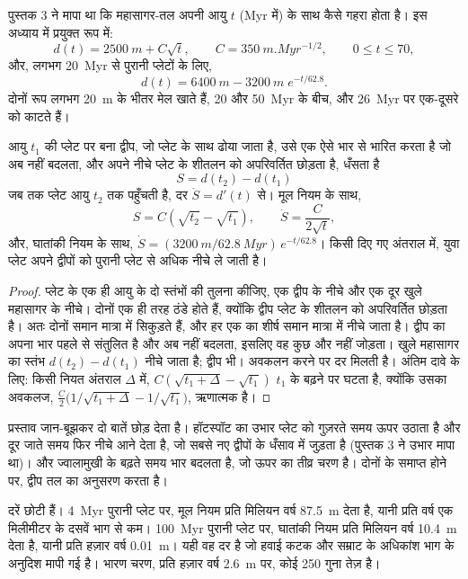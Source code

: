 पुस्तक 3 ने मापा था कि महासागर-तल अपनी आयु $t$ (\unit{Myr} में) के साथ कैसे गहरा होता है। इस
अध्याय में प्रयुक्त रूप में:
\[
d(t) = \qty{2500}{m} + C\sqrt{t}, \qquad C = \qty{350}{m.Myr^{-1/2}}, \qquad 0 \le t \le 70,
\]
और, लगभग \qty{20}{Myr} से पुरानी प्लेटों के लिए,
\[
d(t) = \qty{6400}{m} - \qty{3200}{m}\; e^{-t/62.8}.
\]
दोनों रूप लगभग \qty{20}{m} के भीतर मेल खाते हैं, 20 और \qty{50}{Myr} के बीच, और
\qty{26}{Myr} पर एक-दूसरे को काटते हैं।

\begin{proposition}[द्वीप का तापीय धँसाव]\label{prop:b2:oceanic-islands:sinking}
आयु $t_1$ की प्लेट पर बना द्वीप, जो प्लेट के साथ ढोया जाता है, उसे एक ऐसे भार से भारित करता है जो
अब नहीं बदलता, और अपने नीचे प्लेट के शीतलन को अपरिवर्तित छोड़ता है, धँसता है
\[
S = d(t_2) - d(t_1)
\]
जब तक प्लेट आयु $t_2$ तक पहुँचती है, दर $\dot S = d'(t)$ से। मूल नियम के साथ,
\[
S = C\left(\sqrt{t_2} - \sqrt{t_1}\right), \qquad \dot S = \frac{C}{2\sqrt t},
\]
और, घातांकी नियम के साथ, $\dot S = (\qty{3200}{m}/\qty{62.8}{Myr})\,e^{-t/62.8}$। किसी
दिए गए अंतराल में, युवा प्लेट अपने द्वीपों को पुरानी प्लेट से अधिक नीचे ले जाती है।
\end{proposition}

\begin{proof}
प्लेट के एक ही आयु के दो स्तंभों की तुलना कीजिए, एक द्वीप के नीचे और एक दूर खुले
महासागर के नीचे। दोनों एक ही तरह ठंडे होते हैं, क्योंकि द्वीप प्लेट के शीतलन को अपरिवर्तित छोड़ता है। अतः दोनों समान मात्रा में सिकुड़ते हैं, और हर एक का शीर्ष समान
मात्रा में नीचे जाता है। द्वीप का अपना भार पहले से संतुलित है और अब नहीं बदलता, इसलिए वह कुछ
और नहीं जोड़ता। खुले महासागर का स्तंभ $d(t_2) - d(t_1)$ नीचे जाता है; द्वीप भी। अवकलन करने पर
दर मिलती है। अंतिम दावे के लिए: किसी नियत अंतराल $\Delta$ में, $C(\sqrt{t_1 + \Delta} -
\sqrt{t_1})$ $t_1$ के बढ़ने पर घटता है, क्योंकि उसका अवकलज, $\frac C2\bigl(1/\sqrt{t_1 + \Delta}
- 1/\sqrt{t_1}\bigr)$, ऋणात्मक है।
\end{proof}

प्रस्ताव जान-बूझकर दो बातें छोड़ देता है। हॉटस्पॉट का उभार प्लेट को गुज़रते समय
ऊपर उठाता है और दूर जाते समय फिर नीचे आने देता है, जो सबसे नए द्वीपों के धँसाव में जुड़ता है
(पुस्तक 3 ने उभार मापा था)। और ज्वालामुखी के बढ़ते समय भार बदलता है, जो ऊपर का
तीव्र चरण है। दोनों के समाप्त होने पर, द्वीप तल का अनुसरण करता है।

दरें छोटी हैं। \qty{4}{Myr} पुरानी प्लेट पर, मूल नियम प्रति मिलियन वर्ष \qty{87.5}{m}
देता है, यानी प्रति वर्ष एक मिलीमीटर के दसवें भाग से कम। \qty{100}{Myr} पुरानी प्लेट पर, घातांकी
नियम प्रति मिलियन वर्ष \qty{10.4}{m} देता है, यानी प्रति हज़ार वर्ष \qty{0.01}{m}। यही वह दर है
जो हवाई कटक और सम्राट  के अधिकांश भाग के अनुदिश मापी गई है। भारण चरण,
प्रति हज़ार वर्ष \qty{2.6}{m} पर, कोई 250 गुना तेज़ है।

